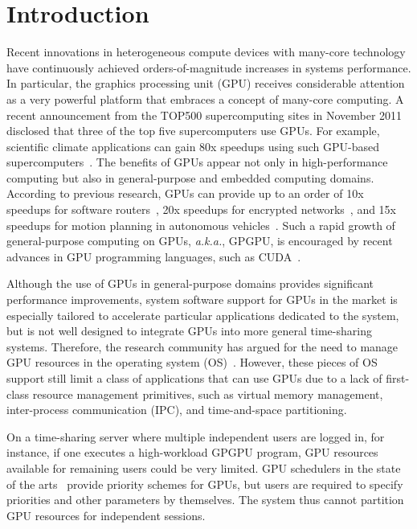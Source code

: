 \section{Introduction}
\label{sec:introduction}

Recent innovations in heterogeneous compute devices with many-core
technology have continuously achieved orders-of-magnitude increases in
systems performance. 
In particular, the graphics processing unit (GPU) receives considerable
attention as a very powerful platform that embraces a concept of
many-core computing.
A recent announcement from the TOP500 supercomputing sites in November
2011~\cite{TOP500} disclosed that three of the top five supercomputers
use GPUs.
For example, scientific climate applications can gain 80x speedups using
such GPU-based supercomputers~\cite{Shimokawabe10}.
The benefits of GPUs appear not only in high-performance computing but
also in general-purpose and embedded computing domains.
According to previous research, GPUs can provide up to an order of 10x
speedups for software routers~\cite{Han_SIGCOMM10}, 20x speedups for
encrypted networks~\cite{Jang_NSDI11}, and 15x speedups for motion
planning in autonomous vehicles~\cite{McNaughton_ICRA11}.
Such a rapid growth of general-purpose computing on GPUs,
\textit{a.k.a.}, GPGPU, is encouraged by recent advances in GPU
programming languages, such as CUDA~\cite{CUDA40}.

Although the use of GPUs in general-purpose domains provides significant
performance improvements, system software support for GPUs in the market
is especially  tailored to accelerate particular applications dedicated
to the system, but is not well designed to integrate GPUs into more
general time-sharing systems.
Therefore, the research community has argued for the need to manage GPU
resources in the operating system (OS)~\cite{Bautin_MCNC08, Kato_ATC11,
Rossbach_SOSP11}.
However, these pieces of OS support still limit a class of applications
that can use GPUs due to a lack of first-class resource management
primitives, such as virtual memory management, inter-process
communication (IPC), and time-and-space partitioning.

On a time-sharing server where multiple independent users are logged in,
for instance, if one executes a high-workload GPGPU program, GPU
resources available for remaining users could be very limited. 
GPU schedulers in the state of the arts~\cite{Kato_ATC11,
Rossbach_SOSP11} provide priority schemes for GPUs, but users
are required to specify priorities and other parameters by themselves.
The system thus cannot partition GPU resources for independent sessions.

